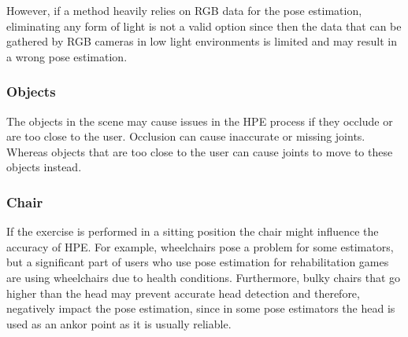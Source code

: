 However, if a method heavily relies on RGB data for the pose estimation, eliminating any form of light is not a valid option since then the data that can be gathered by RGB cameras in low light environments is limited and may result in a wrong pose estimation.

\subsubsection{Objects}

The objects in the scene may cause issues in the HPE process if they occlude or are too close to the user. Occlusion can cause inaccurate or missing joints. Whereas objects that are too close to the user can cause joints to move to these objects instead.

\subsubsection{Chair}

If the exercise is performed in a sitting position the chair might influence the accuracy of HPE. For example, wheelchairs pose a problem for some estimators, but a significant part of users who use pose estimation for rehabilitation games are using wheelchairs due to health conditions. Furthermore, bulky chairs that go higher than the head may prevent accurate head detection and therefore, negatively impact the pose estimation, since in some pose estimators the head is used as an ankor point as it is usually reliable.
